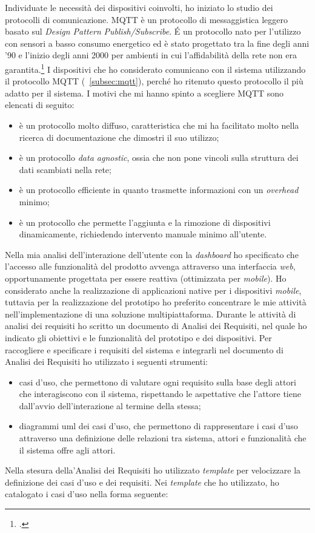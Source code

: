 Individuate le necessità dei dispositivi coinvolti, ho iniziato lo studio dei protocolli di comunicazione. \gls{MQTT} è un protocollo di messaggistica leggero basato sul \emph{Design Pattern} \emph{Publish/Subscribe}.
É un protocollo nato per l'utilizzo con sensori a basso consumo energetico ed è stato progettato tra la fine degli anni '90 e l'inizio degli anni 2000 per ambienti in cui l'affidabilità della rete non era garantita.\footcite{mqtt}
I dispositivi che ho considerato comunicano con il sistema utilizzando il protocollo MQTT (~\ref{subsec:mqtt}), perché ho ritenuto questo protocollo il più adatto per il sistema.
I motivi che mi hanno spinto a scegliere MQTT sono elencati di seguito:
\begin{itemize}
	\item è un protocollo molto diffuso, caratteristica che mi ha facilitato molto nella ricerca di documentazione che dimostri il suo utilizzo;
	\item è un protocollo \emph{data agnostic}, ossia che non pone vincoli sulla struttura dei dati scambiati nella rete;
	\item è un protocollo efficiente in quanto trasmette informazioni con un \emph{overhead} minimo;
	\item è un protocollo che permette l'aggiunta e la rimozione di dispositivi dinamicamente, richiedendo intervento manuale minimo all'utente.
\end{itemize}

Nella mia analisi dell'interazione dell'utente con la \emph{dashboard} ho specificato che l'accesso alle funzionalità del prodotto avvenga attraverso una interfaccia \emph{web}, opportunamente progettata per essere reattiva (ottimizzata per \emph{mobile}). Ho considerato anche la realizzazione di applicazioni native per i dispositivi \emph{mobile}, tuttavia per la realizzazione del prototipo ho preferito concentrare le mie attività nell'implementazione di una soluzione multipiattaforma.
Durante le attività di analisi dei requisiti ho scritto un documento di Analisi dei Requisiti, nel quale ho indicato gli obiettivi e le funzionalità del prototipo e dei dispositivi.
Per raccogliere e specificare i requisiti del sistema e integrarli nel documento di Analisi dei Requisiti ho utilizzato i seguenti strumenti:
\begin{itemize}
  \item casi d'uso, che permettono di valutare ogni requisito sulla base degli attori che interagiscono con il sistema, rispettando le aspettative che l'attore tiene dall'avvio dell'interazione al termine della stessa;
  \item diagrammi \gls{uml} dei casi d'uso, che permettono di rappresentare i casi d'uso attraverso una definizione delle relazioni tra sistema, attori e funzionalità che il sistema offre agli attori.
\end{itemize}
Nella stesura della'Analisi dei Requisiti ho utilizzato \emph{template} per velocizzare la definizione dei casi d'uso e dei requisiti.
Nei \emph{template} che ho utilizzato, ho catalogato i casi d’uso nella forma seguente:

